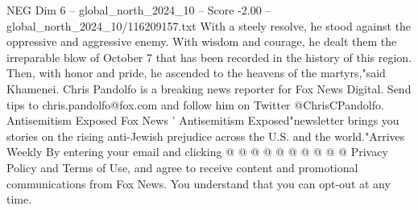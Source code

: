 \begin{textsample}{NEG Dim 6 – global\_north\_2024\_10 – Score -2.00 – global\_north\_2024\_10/116209157.txt}
With a steely resolve, he stood against the oppressive and aggressive enemy.
With wisdom and courage, he dealt them the irreparable blow of October 7 that has been recorded in the history of this region.
Then, with honor and pride, he ascended to the heavens of the martyrs,"said Khamenei.
Chris Pandolfo is a breaking news reporter for Fox News Digital.
Send tips to chris.pandolfo@fox.com and follow him on Twitter @ChrisCPandolfo.
Antisemitism Exposed Fox News ' Antisemitism Exposed"newsletter brings you stories on the rising anti-Jewish prejudice across the U.S. and the world."Arrives Weekly By entering your email and clicking @ @ @ @ @ @ @ @ @ @ Privacy Policy and Terms of Use, and agree to receive content and promotional communications from Fox News.
You understand that you can opt-out at any time.

\end{textsample}
